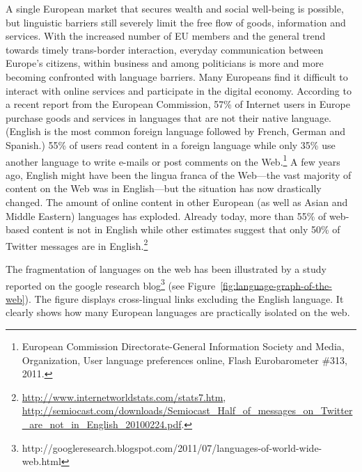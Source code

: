 \begin{multicols}{2}
A single European market that secures wealth and social well-being is possible, but linguistic barriers still severely limit the free flow of goods, information and services. With the increased number of EU members and the general trend towards timely trans-border interaction, everyday communication between Europe’s citizens, within business and among politicians is more and more becoming confronted with language barriers. Many Europeans find it difficult to interact with online services and participate in the digital economy. According to a recent report from the European Commission, 57\% of Internet users in Europe purchase goods and services in languages that are not their native language. (English is the most common foreign language followed by French, German and Spanish.) 55\% of users read content in a foreign language while only 35\% use another language to write e-mails or post comments on the Web.\footnote{European Commission Directorate-General Information Society and Media, Organization, User language preferences online, Flash Eurobarometer \#313, 2011.}  A few years ago, English might have been the lingua franca of the Web—the vast majority of content on the Web was in English—but the situation has now drastically changed. The amount of online content in other European (as well as Asian and Middle Eastern) languages has exploded. Already today, more than 55\% of web-based content is not in English while other estimates suggest that only 50\% of Twitter messages are in English.\footnote{\url{http://www.internetworldstats.com/stats7.htm}, \url{http://semiocast.com/downloads/Semiocast_Half_of_messages_on_Twitter_are_not_in_English_20100224.pdf}.}

The fragmentation of languages on the web has been illustrated by a study reported on the google research blog\footnote{http://googleresearch.blogspot.com/2011/07/languages-of-world-wide-web.html} (see Figure~\ref{fig:language-graph-of-the-web}). The figure displays cross-lingual links excluding the English language. It clearly shows how many European languages are practically isolated on the web.


\end{multicols}
